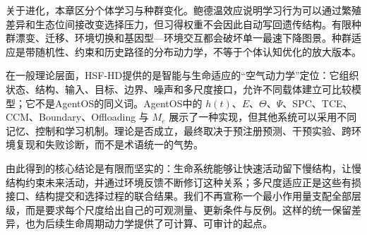 关于进化，本章区分个体学习与种群变化。鲍德温效应说明学习行为可以通过繁殖差异和生态位间接改变选择压力，但习得权重不会因此自动写回遗传结构。有限种群漂变、迁移、环境切换和基因型—环境交互都会破坏单一最速下降图景。种群适应是带随机性、约束和历史路径的分布动力学，不等于个体认知优化的放大版本。

在一般理论层面，HSF-HD提供的是智能与生命适应的“空气动力学”定位：它组织状态、结构、输入、目标、边界、噪声和多尺度接口，允许不同载体建立可比较模型；它不是AgentOS的同义词。AgentOS中的 $h(t)$、$E$、$\Theta$、$\Psi$、SPC、TCE、CCM、Boundary、Offloading 与 $M_e$ 展示了一种实现，但其他系统可以采用不同记忆、控制和学习机制。理论是否成立，最终取决于预注册预测、干预实验、跨环境复现和失败诊断，而不是术语统一的气势。

由此得到的核心结论是有限而坚实的：生命系统能够让快速活动留下慢结构，让慢结构约束未来活动，并通过环境反馈不断修订这种关系；多尺度适应正是这些有损接口、结构提交和选择过程的联合结果。我们不再宣称一个最小作用量支配全部层级，而是要求每个尺度给出自己的可观测量、更新条件与反例。这样的统一保留差异，也为后续生命周期动力学提供了可计算、可审计的起点。
